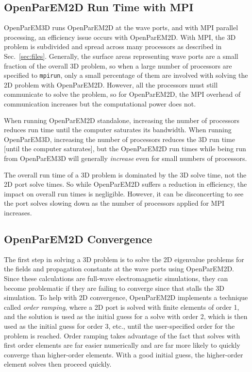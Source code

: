 \documentclass[titlepage]{article}
\renewcommand\_{\textunderscore\linebreak[1]}
\begin{document}
\subsection{OpenParEM2D Run Time with MPI}

OpenParEM3D runs OpenParEM2D at the wave ports, and with MPI parallel processing, an efficiency issue occurs with OpenParEM2D.  With MPI, the 3D problem is subdivided and spread across many processors as described in Sec.~\ref{sec:files}.  Generally, the surface areas representing wave ports are a small fraction of the overall 3D problem, so when a large number of processors are specified to \texttt{mpirun}, only a small percentage of them are involved with solving the 2D problem with OpenParEM2D.  However, all the processors must still communicate to solve the problem, so for OpenParEM2D, the MPI overhead of communication increases but the computational power does not. 

When running OpenParEM2D standalone, increasing the number of processors reduces run time until the computer saturates its bandwidth.  When running OpenParEM3D, increasing the number of processors reduces the 3D run time [until the computer saturates], but the OpenParEM2D run times while being run from OpenParEM3D will generally \textit{increase} even for small numbers of processors.

The overall run time of a 3D problem is dominated by the 3D solve time, not the 2D port solve times.  So while OpenParEM2D suffers a reduction in efficiency, the impact on overall run times is negligible.  However, it can be disconcerting to see the port solves slowing down as the number of processors applied for MPI increases.

\subsection{OpenParEM2D Convergence}

The first step in solving a 3D problem is to solve the 2D eigenvalue problems for the fields and propagation constants at the wave ports using OpenParEM2D.  Since these calculations are full-wave electromagnetic simulations, they can become problematic if they are failing to converge since that stalls the 3D simulation. To help with 2D convergence, OpenParEM2D implements a technique called \textit{order ramping}, where a 2D port is solved with finite elements of order 1, and the solution is used as the initial guess for a solve with order 2, which is then used as the initial guess for order 3, etc., until the user-specified order for the problem is reached.  Order ramping takes advantage of the fact that solves with first order elements are far easier numerically and are far more likely to quickly converge than higher-order elements.  With a good initial guess, the higher-order element solves then proceed quickly.
\end{document}
